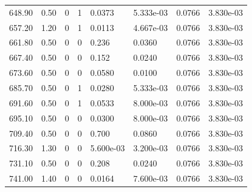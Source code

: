 \documentclass[preview]{standalone}
\begin{document}
{{{\begin{tabular}{L{1.2cm}C{1.2cm} C{0.3cm}C{0.5cm} C{1.4cm}C{1.4cm} C{1.4cm}C{1.4cm}}
  648.90  &  0.50  & 0     &  1 &  0.0373  & 5.333e-03  & 0.0766 &  3.830e-03   \\ 
  657.20  &  1.20  & 0     &  1 &  0.0113  & 4.667e-03  & 0.0766 &  3.830e-03   \\ 
  661.80  &  0.50  & 0     &  0 &  0.236  & 0.0360  & 0.0766 &  3.830e-03   \\ 
  667.40  &  0.50  & 0     &  0 &  0.152  & 0.0240  & 0.0766 &  3.830e-03   \\ 
  673.60  &  0.50  & 0     &  0 &  0.0580  & 0.0100  & 0.0766 &  3.830e-03   \\ 
  685.70  &  0.50  & 0     &  1 &  0.0280  & 5.333e-03  & 0.0766 &  3.830e-03   \\ 
  691.60  &  0.50  & 0     &  1 &  0.0533  & 8.000e-03  & 0.0766 &  3.830e-03   \\ 
  695.10  &  0.50  & 0     &  0 &  0.0300  & 8.000e-03  & 0.0766 &  3.830e-03   \\ 
  709.40  &  0.50  & 0     &  0 &  0.700  & 0.0860  & 0.0766 &  3.830e-03   \\ 
  716.30  &  1.30  & 0     &  0 &  5.600e-03  & 3.200e-03  & 0.0766 &  3.830e-03   \\ 
  731.10  &  0.50  & 0     &  0 &  0.208  & 0.0240  & 0.0766 &  3.830e-03   \\ 
  741.00  &  1.40  & 0     &  0 &  0.0164  & 7.600e-03  & 0.0766 &  3.830e-03   \\ 
\hline 
\end{tabular} 

}}}
\end{document}
